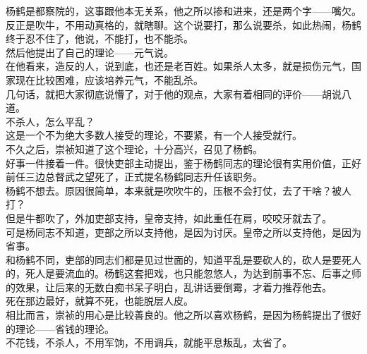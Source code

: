 \begin{multicols}{\theparacolNo}
杨鹤是都察院的，这事跟他本无关系，他之所以掺和进来，还是两个字——嘴欠。\\

反正是吹牛，不用动真格的，就瞎聊。这个说要打，那么说要杀，如此热闹，杨鹤终于忍不住了，他说，不能打，也不能杀。\\

然后他提出了自己的理论——元气说。\\

在他看来，造反的人，说到底，也还是老百姓。如果杀人太多，就是损伤元气，国家现在比较困难，应该培养元气，不能乱杀。\\

几句话，就把大家彻底说懵了，对于他的观点，大家有着相同的评价——胡说八道。\\

不杀人，怎么平乱？\\

这是一个不为绝大多数人接受的理论，不要紧，有一个人接受就行。\\

不久之后，崇祯知道了这个理论，十分高兴，召见了杨鹤。\\

好事一件接着一件。很快吏部主动提出，鉴于杨鹤同志的理论很有实用价值，正好前任三边总督武之望死了，正式提名杨鹤同志升任该职务。\\

杨鹤不想去。原因很简单，本来就是吹吹牛的，压根不会打仗，去了干啥？被人打？\\

但是牛都吹了，外加吏部支持，皇帝支持，如此重任在肩，咬咬牙就去了。\\

可是杨同志不知道，吏部之所以支持他，是因为讨厌。皇帝之所以支持他，是因为省事。\\

和杨鹤不同，吏部的同志们都是见过世面的，知道平乱是要砍人的，砍人是要死人的，死人是要流血的。杨鹤这套把戏，也只能忽悠人，为达到前事不忘、后事之师的效果，让后来的无数白痴书呆子明白，乱讲话要倒霉，才着力推荐他去。\\

死在那边最好，就算不死，也能脱层人皮。\\

相比而言，崇祯的用心是比较善良的。他之所以喜欢杨鹤，是因为杨鹤提出了很好的理论——省钱的理论。\\

不花钱，不杀人，不用军饷，不用调兵，就能平息叛乱，太省了。\\


\end{multicols}
